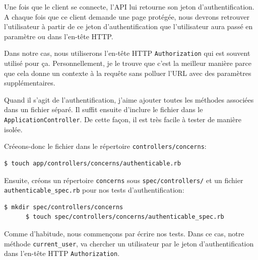 \documentclass[]{report}
\begin{document}
    Une fois que le client se connecte, l'API lui retourne son jeton d'authentification. A chaque fois que ce client demande une page protégée, nous devrons retrouver l'utilisateur à partir de ce jeton d'authentification que l'utilisateur aura passé en paramètre ou dans l'en-tête HTTP.

    Dans notre cas, nous utiliserons l'en-tête HTTP \verb|Authorization| qui est souvent utilisé pour ça. Personnellement, je le trouve que c'est la meilleur manière parce que cela donne un contexte à la requête sans polluer l'URL avec des paramètres supplémentaires.

    Quand il s'agit de l'authentification, j'aime ajouter toutes les méthodes associées dans un fichier séparé. Il suffit ensuite d'inclure le fichier dans le \verb|ApplicationController|. De cette façon, il est très facile à tester de manière isolée.

    Créeons-donc le fichier dans le répertoire \verb|controllers/concerns|:

    \begin{scriptsize}
      \begin{lstlisting}[language=bash]
      $ touch app/controllers/concerns/authenticable.rb
      \end{lstlisting}
    \end{scriptsize}

    Ensuite, créons un répertoire \verb|concerns| sous \verb|spec/controllers/| et un fichier \verb|authenticable_spec.rb| pour nos tests d'authentification:

    \begin{scriptsize}
      \begin{lstlisting}[language=bash]
      $ mkdir spec/controllers/concerns
      $ touch spec/controllers/concerns/authenticable_spec.rb
      \end{lstlisting}
    \end{scriptsize}

    Comme d'habitude, nous commençons par écrire nos tests. Dans ce cas, notre méthode \verb|current_user|, va chercher un utilisateur par le jeton d'authentification dans l'en-tête HTTP \verb|Authorization|.
\end{document}
